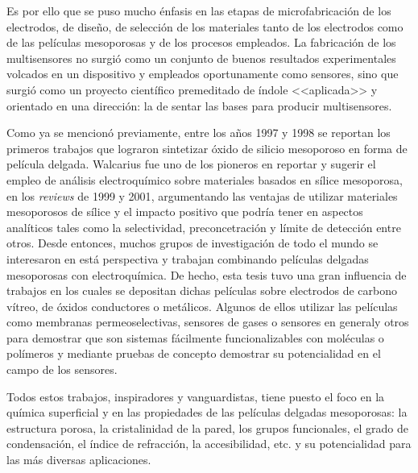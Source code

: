 	Es por ello que se puso mucho énfasis en las etapas de microfabricación de los electrodos, de diseño, de selección de los materiales tanto de los electrodos como de las películas mesoporosas y de los procesos empleados. La fabricación de los multisensores no surgió como un conjunto de buenos resultados experimentales volcados en un dispositivo y empleados oportunamente como sensores, sino que surgió como un proyecto científico premeditado de índole <<aplicada>> y orientado en una dirección: la de sentar las bases para producir multisensores.

	Como ya se mencionó previamente, entre los años 1997 y 1998 se reportan los primeros trabajos que lograron sintetizar óxido de silicio mesoporoso en forma de película delgada. \cite{Lu1997,Zhao1998a,Zhao1998,Brinker1999} Walcarius fue uno de los pioneros en reportar y sugerir el empleo de análisis electroquímico sobre materiales basados en sílice mesoporosa, en los \textit{reviews} de 1999\cite{walcarius1999} y 2001\cite{walcariussss2001}, argumentando las ventajas de utilizar materiales mesoporosos de sílice y el impacto positivo que podría tener en aspectos analíticos tales como la selectividad, preconcetración y límite de detección entre otros. Desde entonces, muchos grupos de investigación de todo el mundo se interesaron en está perspectiva y trabajan combinando películas delgadas mesoporosas con electroquímica.\cite{Etienne2013,walcarius2007,Vila2016,Rohlfing2005,ConeoRodriguez2018,walcarius2013,Calvo2010,Andrieu-Brunsen2015,Gaitan2010} De hecho, esta tesis tuvo una gran influencia de trabajos en los cuales se depositan dichas películas sobre electrodos de carbono vítreo, de óxidos conductores o metálicos. Algunos de ellos  utilizar las películas como membranas permeoselectivas\cite{Fattakhova-Rohlfing2007,Andrieu-Brunsen2015,Calvo2009}, sensores de gases\cite{Wagner2013} o sensores en general\cite{Innocenzi2013,nasir2018}y otros para demostrar que son sistemas fácilmente funcionalizables con moléculas\cite{Liu2003b,Calvo2008,Soler-Illia2012,Photong2009} o polímeros\cite{brunsen2011,Andrieu-Brunsen2015,Krohm2014} y mediante pruebas de concepto demostrar su potencialidad en el campo de los sensores.\cite{walcarius2008,Innocenzi2013}

	Todos estos trabajos, inspiradores y vanguardistas, tiene puesto el foco en la química superficial y en las propiedades de las películas delgadas mesoporosas: la estructura porosa, la cristalinidad de la pared, los grupos funcionales, el grado de condensación, el índice de refracción, la accesibilidad, etc. y su potencialidad para las más diversas aplicaciones.


